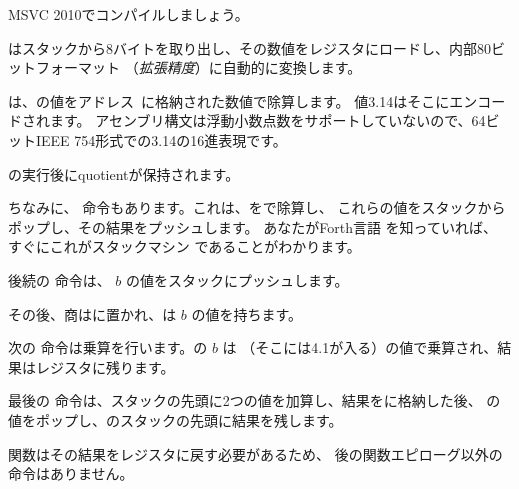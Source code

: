 ﻿

MSVC 2010でコンパイルしましょう。



\FLD はスタックから8バイトを取り出し、その数値をレジスタにロードし、内部80ビットフォーマット
（\emph{拡張精度}）に自動的に変換します。


\FDIV は、の値をアドレス~に格納された数値で除算します。
値3.14はそこにエンコードされます。
アセンブリ構文は浮動小数点数をサポートしていないので、64ビットIEEE 754形式での3.14の16進表現です。

\FDIV {}の実行後に\gls{quotient}が保持されます。


ちなみに、 \FDIVP 命令もあります。これは、をで除算し、
これらの値をスタックからポップし、その結果をプッシュします。
あなたがForth言語 を知っていれば、
すぐにこれがスタックマシン であることがわかります。

後続の \FLD 命令は、 $b$ の値をスタックにプッシュします。

その後、商はに置かれ、は $b$ の値を持ちます。


次の \FMUL 命令は乗算を行います。の $b$ は
（そこには4.1が入る）の値で乗算され、結果はレジスタに残ります。


最後の \FADDP 命令は、スタックの先頭に2つの値を加算し、結果をに格納した後、
の値をポップし、のスタックの先頭に結果を残します。

関数はその結果をレジスタに戻す必要があるため、
\FADDP 後の関数エピローグ以外の命令はありません。


